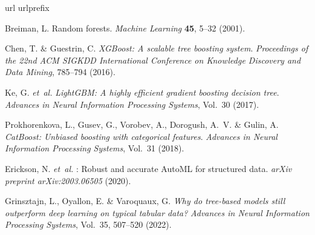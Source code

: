 \documentclass[pdflatex,sn-nature]{sn-jnl}
\begin{document}
\begin{thebibliography}{10}
\expandafter\ifx\csname url\endcsname\relax
  \def\url#1{\burl{#1}}\fi
\expandafter\ifx\csname urlprefix\endcsname\relax\def\urlprefix{URL }\fi
\providecommand{\bibinfo}[2]{#2}
\providecommand{\eprint}[2][]{\url{#2}}
\providecommand{\doi}[1]{\url{https://doi.org/#1}}
\bibcommenthead

\bibinfo{author}{Breiman, L.}
\newblock \bibinfo{title}{Random forests}.
\newblock \emph{\bibinfo{journal}{Machine Learning}}
  \textbf{\bibinfo{volume}{45}}, \bibinfo{pages}{5--32} (\bibinfo{year}{2001}).

\bibinfo{author}{Chen, T.} \& \bibinfo{author}{Guestrin, C.}
\newblock \emph{\bibinfo{title}{{XGBoost}: A scalable tree boosting system}}.
\newblock \emph{\bibinfo{booktitle}{Proceedings of the 22nd ACM SIGKDD
  International Conference on Knowledge Discovery and Data Mining}},
  \bibinfo{pages}{785--794} (\bibinfo{year}{2016}).

\bibinfo{author}{Ke, G.} \emph{et~al.}
\newblock \emph{\bibinfo{title}{{LightGBM}: A highly efficient gradient
  boosting decision tree}}.
\newblock \emph{\bibinfo{booktitle}{Advances in Neural Information Processing
  Systems}}, Vol.~\bibinfo{volume}{30} (\bibinfo{year}{2017}).

\bibinfo{author}{Prokhorenkova, L.}, \bibinfo{author}{Gusev, G.},
  \bibinfo{author}{Vorobev, A.}, \bibinfo{author}{Dorogush, A.~V.} \&
  \bibinfo{author}{Gulin, A.}
\newblock \emph{\bibinfo{title}{{CatBoost}: Unbiased boosting with categorical
  features}}.
\newblock \emph{\bibinfo{booktitle}{Advances in Neural Information Processing
  Systems}}, Vol.~\bibinfo{volume}{31} (\bibinfo{year}{2018}).

\bibinfo{author}{Erickson, N.} \emph{et~al.}
\newblock \bibinfo{title}{{AutoGluon-Tabular}: Robust and accurate {AutoML} for
  structured data}.
\newblock \emph{\bibinfo{journal}{arXiv preprint arXiv:2003.06505}}
  (\bibinfo{year}{2020}).

\bibinfo{author}{Grinsztajn, L.}, \bibinfo{author}{Oyallon, E.} \&
  \bibinfo{author}{Varoquaux, G.}
\newblock \emph{\bibinfo{title}{Why do tree-based models still outperform deep
  learning on typical tabular data?}}
\newblock \emph{\bibinfo{booktitle}{Advances in Neural Information Processing
  Systems}}, Vol.~\bibinfo{volume}{35}, \bibinfo{pages}{507--520}
  (\bibinfo{year}{2022}).


\end{thebibliography}
\end{document}
